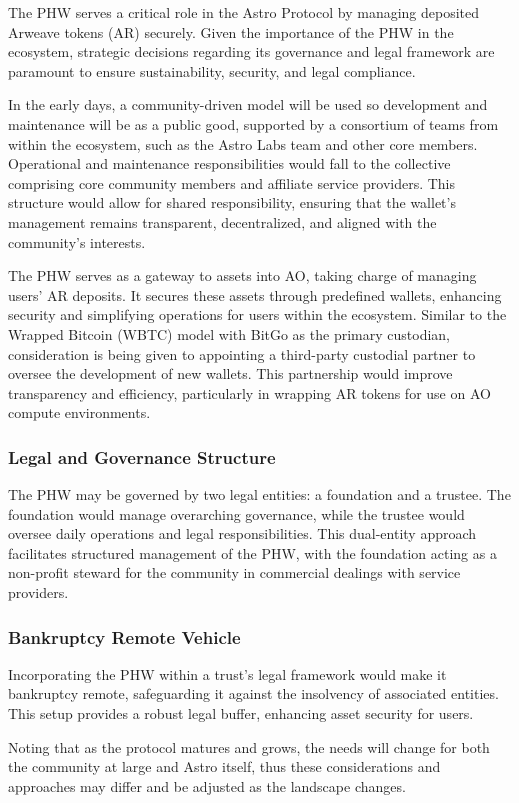 The PHW serves a critical role in the Astro Protocol by managing deposited Arweave tokens (AR) securely. Given the importance of the PHW in the ecosystem, strategic decisions regarding its governance and legal framework are paramount to ensure sustainability, security, and legal compliance.

In the early days, a community-driven model will be used so development and maintenance will be as a public good, supported by a consortium of teams from within the ecosystem, such as the Astro Labs team and other core members. Operational and maintenance responsibilities would fall to the collective comprising core community members and affiliate service providers. This structure would allow for shared responsibility, ensuring that the wallet's management remains transparent, decentralized, and aligned with the community's interests.

The PHW serves as a gateway to assets into AO, taking charge of managing users' AR deposits. It secures these assets through predefined wallets, enhancing security and simplifying operations for users within the ecosystem. Similar to the Wrapped Bitcoin (WBTC) model with BitGo as the primary custodian, consideration is being given to appointing a third-party custodial partner to oversee the development of new wallets. This partnership would improve transparency and efficiency, particularly in wrapping AR tokens for use on AO compute environments.

\subsubsection{Legal and Governance Structure}
The PHW may be governed by two legal entities: a foundation and a trustee. The foundation would manage overarching governance, while the trustee would oversee daily operations and legal responsibilities. This dual-entity approach facilitates structured management of the PHW, with the foundation acting as a non-profit steward for the community in commercial dealings with service providers.

\subsubsection{Bankruptcy Remote Vehicle}
Incorporating the PHW within a trust's legal framework would make it bankruptcy remote, safeguarding it against the insolvency of associated entities. This setup provides a robust legal buffer, enhancing asset security for users.

Noting that as the protocol matures and grows, the needs will change for both the community at large and Astro itself, thus these considerations and approaches may differ and be adjusted as the landscape changes.